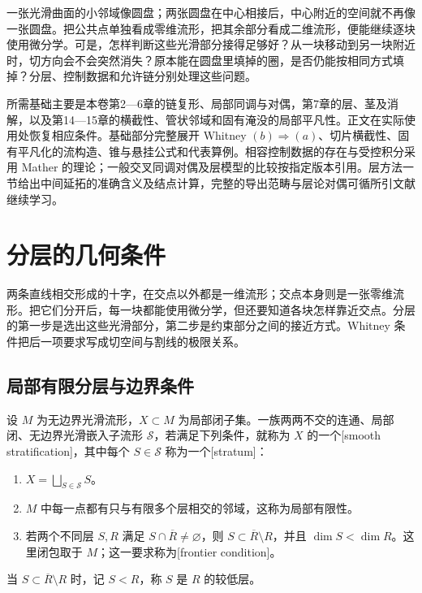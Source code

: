 一张光滑曲面的小邻域像圆盘；两张圆盘在中心相接后，中心附近的空间就不再像一张圆盘。把公共点单独看成零维流形，把其余部分看成二维流形，便能继续逐块使用微分学。可是，怎样判断这些光滑部分接得足够好？从一块移动到另一块附近时，切方向会不会突然消失？原本能在圆盘里填掉的圈，是否仍能按相同方式填掉？分层、控制数据和允许链分别处理这些问题。

\ProseParagraphBreak

所需基础主要是本卷第2—6章的链复形、局部同调与对偶，第7章的层、茎及消解，以及第14—15章的横截性、管状邻域和固有淹没的局部平凡性。正文在实际使用处恢复相应条件。基础部分完整展开 Whitney \((b)\Rightarrow(a)\)、切片横截性、固有平凡化的流构造、锥与悬挂公式和代表算例。相容控制数据的存在与受控积分采用 Mather 的理论；一般交叉同调对偶及层模型的比较按指定版本引用。层方法一节给出中间延拓的准确含义及结点计算，完整的导出范畴与层论对偶可循所引文献继续学习。

\section{分层的几何条件}
\label{g2:sec:B01}

两条直线相交形成的十字，在交点以外都是一维流形；交点本身则是一张零维流形。把它们分开后，每一块都能使用微分学，但还要知道各块怎样靠近交点。分层的第一步是选出这些光滑部分，第二步是约束部分之间的接近方式。Whitney 条件把后一项要求写成切空间与割线的极限关系。

\subsection{局部有限分层与边界条件}
\label{g2:subsec:B01:01}

\begin{definition}\label{g2:def:smooth-stratification}
	设 \(M\) 为无边界光滑流形，\(X\subset M\) 为局部闭子集。一族两两不交的连通、局部闭、无边界光滑嵌入子流形 \(\mathcal S\)，若满足下列条件，就称为 \(X\) 的一个[smooth stratification]，其中每个 \(S\in\mathcal S\) 称为一个[stratum]：
	\begin{enumerate}
		\item \(X=\bigsqcup_{S\in\mathcal S}S\)。
		\item \(M\) 中每一点都有只与有限多个层相交的邻域，这称为局部有限性。
		\item 若两个不同层 \(S,R\) 满足 \(S\cap\overline R\ne\varnothing\)，则 \(S\subset\overline R\setminus R\)，并且 \(\dim S<\dim R\)。这里闭包取于 \(M\)；这一要求称为[frontier condition]。
	\end{enumerate}
	当 \(S\subset\overline R\setminus R\) 时，记 \(S<R\)，称 \(S\) 是 \(R\) 的较低层。
\end{definition}

